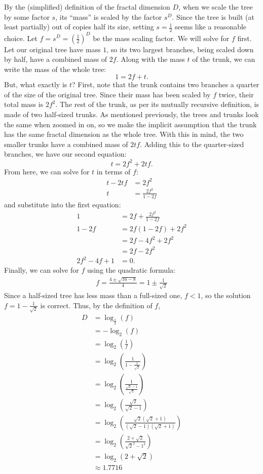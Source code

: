 \documentclass{article}
\begin{document}
By the (simplified) definition of the fractal dimension $D$,
when we scale the tree by some factor $s$,
its ``mass'' is scaled by the factor $s^D$.
Since the tree is built (at least partially) out of copies half its size,
setting $s=\frac{1}{2}$ seems like a reasonable choice.
Let $f=s^D=\left(\frac{1}{2}\right)^D$ be the mass scaling factor.
We will solve for $f$ first.
Let our original tree have mass $1$,
so its two largest branches, being scaled down by half, have a combined mass of $2f$.
Along with the mass $t$ of the trunk, we can write the mass of the whole tree:
\[1 = 2f+t.\]
But, what exactly is $t$?
First, note that the trunk contains two branches a quarter of the size of the original tree.
Since their mass has been scaled by $f$ twice, their total mass is $2f^2$.
The rest of the trunk, as per its mutually recursive definition,
is made of two half-sized trunks.
As mentioned previously, the trees and trunks look the same when zoomed in on,
so we make the implicit assumption that the trunk has the same fractal dimension as the whole tree.
With this in mind, the two smaller trunks have a combined mass of $2tf$.
Adding this to the quarter-sized branches, we have our second equation:
\[t = 2f^2+2tf.\]
From here, we can solve for $t$ in terms of $f$:
\begin{align*}
  t-2tf &= 2f^2 \\
  t &= \frac{2f^2}{1-2f}
\end{align*}
and substitute into the first equation:
\begin{align*}
  1 &= 2f+\frac{2f^2}{1-2f}\\
  1-2f &= 2f(1-2f)+2f^2\\
  &= 2f-4f^2+2f^2\\
  &= 2f-2f^2 \\
  2f^2-4f+1 &= 0.
\end{align*}
Finally, we can solve for $f$ using the quadratic formula:
\begin{align*}
  f = \frac{4\pm\sqrt{16-8}}{4} = 1\pm\frac{1}{\sqrt{2}}
\end{align*}
Since a half-sized tree has less mass than a full-sized one, $f<1$,
so the solution $f=1-\frac{1}{\sqrt{2}}$ is correct.
Thus, by the definition of $f$,
\begin{align*}
  D &= \log_{\frac{1}{2}}(f)\\
  &= -\log_2(f)\\
  &= \log_2\left(\frac{1}{f}\right)\\
  &= \log_2\left(\frac{1}{1-\frac{1}{\sqrt{2}}}\right)\\
  &= \log_2\left(\frac{1}{\frac{\sqrt{2}-1}{\sqrt{2}}}\right)\\
  &= \log_2\left(\frac{\sqrt{2}}{\sqrt{2}-1}\right)\\
  &= \log_2\left(\frac{\sqrt{2}(\sqrt{2}+1)}{(\sqrt{2}-1)(\sqrt{2}+1)}\right)\\
  &= \log_2\left(\frac{2+\sqrt{2}}{\sqrt{2}^2-1^2}\right)\\
  &= \log_2\left(2+\sqrt{2}\right)\\
  &\approx 1.7716
\end{align*}
\end{document}
